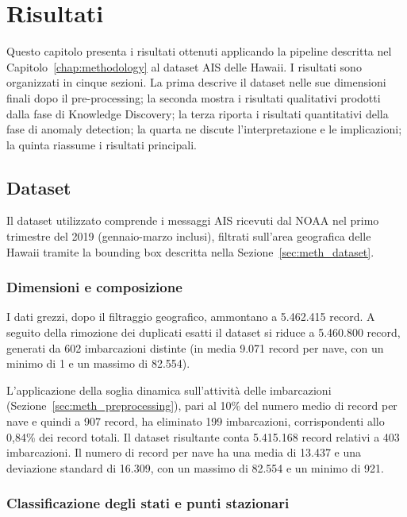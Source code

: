 \chapter{Risultati}\label{chap:results}
 
Questo capitolo presenta i risultati ottenuti applicando la pipeline descritta nel
Capitolo~\ref{chap:methodology} al dataset AIS delle Hawaii.
I risultati sono organizzati in cinque sezioni. La prima descrive il dataset nelle
sue dimensioni finali dopo il pre-processing; la seconda mostra i risultati qualitativi
prodotti dalla fase di Knowledge Discovery; la terza riporta i risultati quantitativi
della fase di anomaly detection; la quarta ne discute l'interpretazione e le implicazioni;
la quinta riassume i risultati principali.
 
\section{Dataset}\label{sec:res_dataset}
 
Il dataset utilizzato comprende i messaggi AIS ricevuti dal NOAA nel primo trimestre
del 2019 (gennaio-marzo inclusi), filtrati sull'area geografica delle Hawaii tramite
la bounding box descritta nella Sezione~\ref{sec:meth_dataset}.
 
\subsection{Dimensioni e composizione}
 
I dati grezzi, dopo il filtraggio geografico, ammontano a 5.462.415 record. A seguito
della rimozione dei duplicati esatti il dataset si riduce a 5.460.800 record, generati
da 602 imbarcazioni distinte (in media 9.071 record per nave, con un minimo di 1 e un
massimo di 82.554).
 
L'applicazione della soglia dinamica sull'attività delle imbarcazioni
(Sezione~\ref{sec:meth_preprocessing}), pari al 10\% del numero medio di record per
nave e quindi a 907 record, ha eliminato 199 imbarcazioni, corrispondenti allo 0,84\%
dei record totali. Il dataset risultante conta 5.415.168 record relativi a 403
imbarcazioni. Il numero di record per nave ha una media di 13.437 e una deviazione standard
di 16.309, con un massimo di 82.554 e un minimo di 921.
 
\subsection{Classificazione degli stati e punti stazionari}
 
